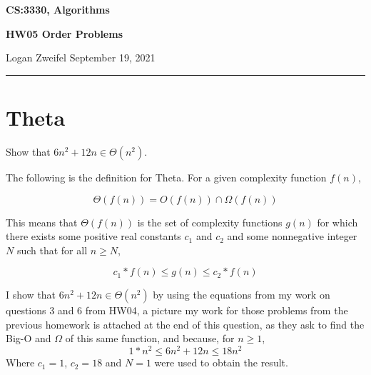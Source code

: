 \documentclass[11pt]{article}
\begin{document}
\thispagestyle{empty}

\begin{center}
\bf\large CS:3330, Algorithms
\end{center}

\begin{center}
\bf\large HW05 Order Problems    %
\end{center}

\noindent
Logan Zweifel     %
\hfill
September 19, 2021           %

\noindent
\rule{\textwidth}{1pt}

\medskip


\section{Theta}
Show that $6n^2+12n \in \Theta(n^2)$.

\bigskip
\bigskip
The following is the definition for Theta. For a given complexity function $f(n)$,

\begin{equation*}
\Theta(f(n))= O(f(n))\cap \Omega(f(n))
\end{equation*}

This means that $\Theta(f(n))$ is the set of complexity functions $g(n)$ for which there exists some positive real constants $c_1$ and $c_2$ and some nonnegative integer $N$ such that for all $n \geq N$,

\begin{equation*}
c_1*f(n) \leq g(n) \leq c_2*f(n)
\end{equation*}


\bigskip
\bigskip

\noindent
I show that $6n^2+12n \in \Theta(n^2)$ by using the equations from my work on questions 3 and 6 from HW04, a picture my work for those problems from the previous homework is attached at the end of this question, as they ask to find the Big-O and $\Omega$ of this same function, and because, for $n \geq 1$,
\begin{equation*}
1*n^2 \leq 6n^2+12n \leq 18n^2
\end{equation*}
Where $c_1=1$, $c_2=18$ and $N=1$ were used to obtain the result.
\end{document}
